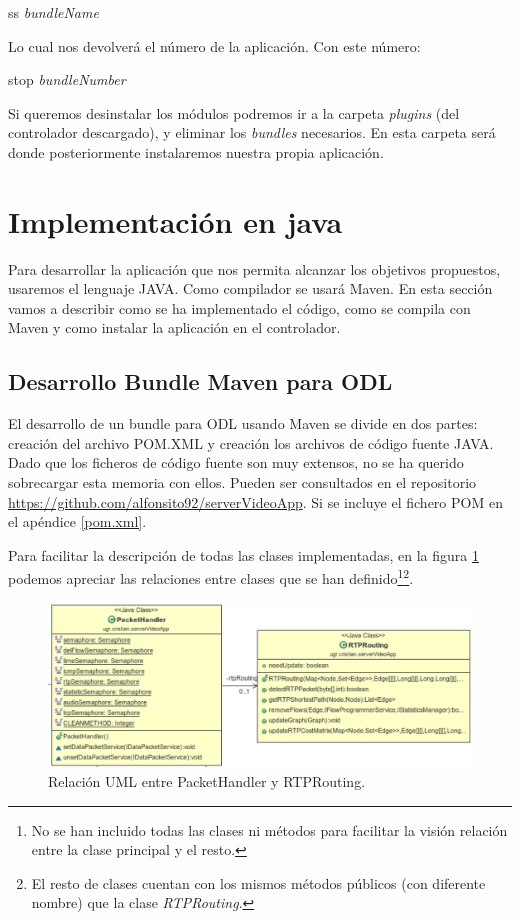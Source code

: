 \documentclass[a4paper,11pt]{book}
\begin{document}
\begin{center}
ss \textit{bundleName}
\end{center}

Lo cual nos devolverá el número de la aplicación. Con este número:

\begin{center}
stop \textit{bundleNumber}
\end{center}

Si queremos desinstalar los módulos podremos ir a la carpeta \textit{plugins} (del controlador descargado), y eliminar los \textit{bundles} necesarios. En esta carpeta será donde posteriormente instalaremos nuestra propia aplicación.

\section{Implementación en java}
Para desarrollar la aplicación que nos permita alcanzar los objetivos propuestos, usaremos el lenguaje JAVA. Como compilador se usará Maven. En esta sección vamos a describir como se ha implementado el código, como se compila con Maven y como instalar la aplicación en el controlador.

\subsection{Desarrollo Bundle Maven para ODL}
El desarrollo de un bundle para \ac{ODL} usando Maven se divide en dos partes: creación del archivo \ac{POM}.\ac{XML} y creación los archivos de código fuente JAVA. Dado que los ficheros de código fuente son muy extensos, no se ha querido sobrecargar esta memoria con ellos. Pueden ser consultados en el repositorio \url{https://github.com/alfonsito92/serverVideoApp}. Si se incluye el fichero \ac{POM} en el apéndice \ref{pom.xml}.

Para facilitar la descripción de todas las clases implementadas, en la figura \ref{clases} podemos apreciar las relaciones entre clases que se han definido\footnote{No se han incluido todas las clases ni métodos para facilitar la visión relación entre la clase principal y el resto.}\footnote{El resto de clases cuentan con los mismos métodos públicos (con diferente nombre) que la clase \textit{RTPRouting}.}.

\begin{figure}[tb]
\centering
\includegraphics[scale=0.6]{./figuras/clases}
\caption{Relación \ac{UML} entre PacketHandler y RTPRouting.}\label{clases}
\end{figure}
\end{document}

